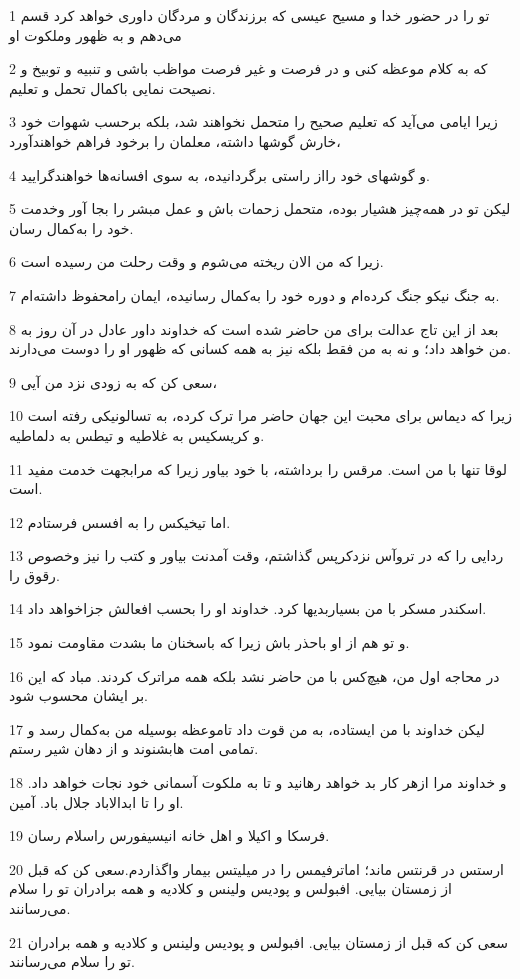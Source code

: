 \par 1 تو را در حضور خدا و مسیح عیسی که برزندگان و مردگان داوری خواهد کرد قسم می‌دهم و به ظهور وملکوت او
\par 2 که به کلام موعظه کنی و در فرصت و غیر فرصت مواظب باشی و تنبیه و توبیخ و نصیحت نمایی باکمال تحمل و تعلیم.
\par 3 زیرا ایامی می‌آید که تعلیم صحیح را متحمل نخواهند شد، بلکه برحسب شهوات خود خارش گوشها داشته، معلمان را برخود فراهم خواهند‌آورد،
\par 4 و گوشهای خود رااز راستی برگردانیده، به سوی افسانه‌ها خواهندگرایید.
\par 5 لیکن تو در همه‌چیز هشیار بوده، متحمل زحمات باش و عمل مبشر را بجا آور وخدمت خود را به‌کمال رسان.
\par 6 زیرا که من الان ریخته می‌شوم و وقت رحلت من رسیده است.
\par 7 به جنگ نیکو جنگ کرده‌ام و دوره خود را به‌کمال رسانیده، ایمان رامحفوظ داشته‌ام.
\par 8 بعد از این تاج عدالت برای من حاضر شده است که خداوند داور عادل در آن روز به من خواهد داد؛ و نه به من فقط بلکه نیز به همه کسانی که ظهور او را دوست می‌دارند.
\par 9 سعی کن که به زودی نزد من آیی،
\par 10 زیرا که دیماس برای محبت این جهان حاضر مرا ترک کرده، به تسالونیکی رفته است و کریسکیس به غلاطیه و تیطس به دلماطیه.
\par 11 لوقا تنها با من است. مرقس را برداشته، با خود بیاور زیرا که مرابجهت خدمت مفید است.
\par 12 اما تیخیکس را به افسس فرستادم.
\par 13 ردایی را که در تروآس نزدکرپس گذاشتم، وقت آمدنت بیاور و کتب را نیز وخصوص رقوق را.
\par 14 اسکندر مسکر با من بسیاربدیها کرد. خداوند او را بحسب افعالش جزاخواهد داد.
\par 15 و تو هم از او باحذر باش زیرا که باسخنان ما بشدت مقاومت نمود.
\par 16 در محاجه اول من، هیچ‌کس با من حاضر نشد بلکه همه مراترک کردند. مباد که این بر ایشان محسوب شود.
\par 17 لیکن خداوند با من ایستاده، به من قوت داد تاموعظه بوسیله من به‌کمال رسد و تمامی امت هابشنوند و از دهان شیر رستم.
\par 18 و خداوند مرا ازهر کار بد خواهد رهانید و تا به ملکوت آسمانی خود نجات خواهد داد. او را تا ابدالاباد جلال باد. آمین.
\par 19 فرسکا و اکیلا و اهل خانه انیسیفورس راسلام رسان.
\par 20 ارستس در قرنتس ماند؛ اماترفیمس را در میلیتس بیمار واگذاردم.سعی کن که قبل از زمستان بیایی. افبولس و پودیس ولینس و کلادیه و همه برادران تو را سلام می‌رسانند.
\par 21 سعی کن که قبل از زمستان بیایی. افبولس و پودیس ولینس و کلادیه و همه برادران تو را سلام می‌رسانند.



